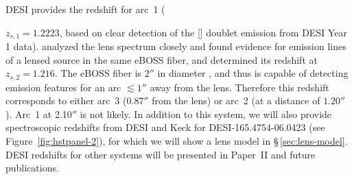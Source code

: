 DESI provides the redshift for arc~1 ({$z_{s, 1} = 1.2223$, based on clear detection of the [] doublet emission from DESI Year 1 data).
\citet{talbot2021a} analyzed the lens spectrum closely and found evidence for emission lines of a lensed source in the same eBOSS fiber, 
and determined its redshift at $z_{s, 2} = 1.216$.
The eBOSS fiber is $2''$ in diameter \citep{dawson2016a},
and thus is capable of detecting emission features for an arc $\lesssim 1''$ away from the lens.
Therefore this redshift corresponds to either arc~3 ($0.87''$ from the lens) or arc~2 (at a distance of $1.20''$).
Arc~1 at 2.10$''$ is not likely.
In addition to this system, we will also provide spectroscopic redshifts from DESI and Keck for  DESI-165.4754-06.0423 (see Figure~\ref{fig:hstpanel-2}), 
for which we will show a lens model in \S\,\ref{sec:lens-model}.
DESI redshifts for other systems will be presented in Paper~II and future publications.

}
